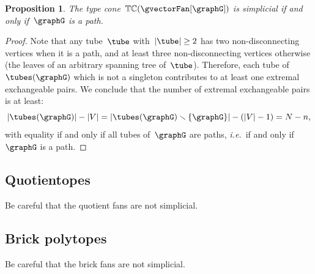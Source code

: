 \documentclass{amsart}
\newtheorem{proposition}[theorem]{Proposition}
\theoremstyle{definition}
\newcommand{\ssm}{\smallsetminus} %
\newcommand{\ie}{\textit{i.e.}~} %
\newcommand{\typeCone}{\mathbb{TC}} %
\begin{document}
\begin{proposition}
The type cone~$\typeCone(\gvectorFan[\graphG])$ is simplicial if and only if~$\graphG$ is a path.
\end{proposition}

\begin{proof}
Note that any tube~$\tube$ with~$|\tube| \ge 2$ has two non-disconnecting vertices when it is a path, and at least three non-disconnecting vertices otherwise (the leaves of an arbitrary spanning tree of~$\tube$).
Therefore, each tube of~$\tubes(\graphG)$ which is not a singleton contributes to at least one extremal exchangeable pairs.
We conclude that the number of extremal exchangeable pairs is at least:
\[
|\tubes(\graphG)| - |V| = |\tubes(\graphG) \ssm \{\graphG\}| - (|V|-1) = N - n,
\]
with equality if and only if all tubes of~$\graphG$ are paths, \ie if and only if~$\graphG$ is a path.
\end{proof}

\subsection{Quotientopes}

Be careful that the quotient fans are not simplicial.

\subsection{Brick polytopes}

Be careful that the brick fans are not simplicial.




\label{sec:biblio}
\end{document}
